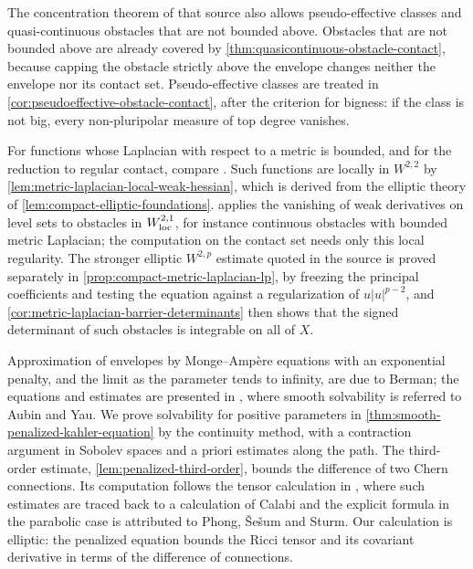 The concentration theorem of that source also allows pseudo-effective classes and quasi-continuous obstacles that are not bounded above. Obstacles that are not bounded above are already covered by \cref{thm:quasicontinuous-obstacle-contact}, because capping the obstacle strictly above the envelope changes neither the envelope nor its contact set. Pseudo-effective classes are treated in \cref{cor:pseudoeffective-obstacle-contact}, after the criterion for bigness: if the class is not big, every non-pluripolar measure of top degree vanishes.

For functions whose Laplacian with respect to a metric is bounded, and for the reduction to regular contact, compare \cite[Lemma 3.1 and the preceding discussion]{DNT2019v1}. Such functions are locally in $W^{2,2}$ by \cref{lem:metric-laplacian-local-weak-hessian}, which is derived from the elliptic theory of \cref{lem:compact-elliptic-foundations}.  applies the vanishing of weak derivatives on level sets to obstacles in $W^{2,1}_{\mathrm{loc}}$, for instance continuous obstacles with bounded metric Laplacian; the computation on the contact set needs only this local regularity. The stronger elliptic $W^{2,p}$ estimate quoted in the source is proved separately in \cref{prop:compact-metric-laplacian-lp}, by freezing the principal coefficients and testing the equation against a regularization of $u|u|^{p-2}$, and \cref{cor:metric-laplacian-barrier-determinants} then shows that the signed determinant of such obstacles is integrable on all of $X$.

Approximation of envelopes by Monge--Amp\`ere equations with an exponential penalty, and the limit as the parameter tends to infinity, are due to Berman; the equations and estimates are presented in \cite[equations (2.1)--(2.2)]{Tos18}, where smooth solvability is referred to Aubin and Yau. We prove solvability for positive parameters in \cref{thm:smooth-penalized-kahler-equation} by the continuity method, with a contraction argument in Sobolev spaces and a priori estimates along the path. The third-order estimate, \cref{lem:penalized-third-order}, bounds the difference of two Chern connections. Its computation follows the tensor calculation in \cite[Proposition 2.8 and Theorem 2.9]{SongWeinkove2012v1}, where such estimates are traced back to a calculation of Calabi and the explicit formula in the parabolic case is attributed to Phong, \v Se\v sum and Sturm. Our calculation is elliptic: the penalized equation bounds the Ricci tensor and its covariant derivative in terms of the difference of connections.


